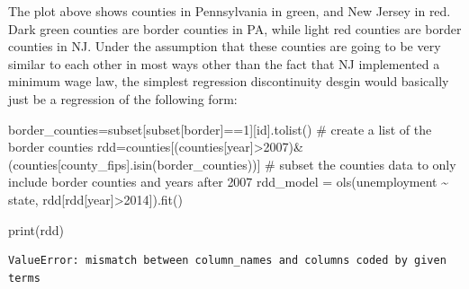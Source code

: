 \documentclass[
  letterpaper,
  DIV=11,
  numbers=noendperiod]{scrreprt}
\newenvironment{Shaded}{\begin{snugshade}}{\end{snugshade}}
\newcommand{\BuiltInTok}[1]{\textcolor[rgb]{0.00,0.23,0.31}{#1}}
\newcommand{\CommentTok}[1]{\textcolor[rgb]{0.37,0.37,0.37}{#1}}
\newcommand{\DecValTok}[1]{\textcolor[rgb]{0.68,0.00,0.00}{#1}}
\newcommand{\NormalTok}[1]{\textcolor[rgb]{0.00,0.23,0.31}{#1}}
\newcommand{\OperatorTok}[1]{\textcolor[rgb]{0.37,0.37,0.37}{#1}}
\newcommand{\StringTok}[1]{\textcolor[rgb]{0.13,0.47,0.30}{#1}}
\begin{document}
The plot above shows counties in Pennsylvania in green, and New Jersey
in red. Dark green counties are border counties in PA, while light red
counties are border counties in NJ. Under the assumption that these
counties are going to be very similar to each other in most ways other
than the fact that NJ implemented a minimum wage law, the simplest
regression discontinuity desgin would basically just be a regression of
the following form:

\begin{Shaded}
\begin{Highlighting}[]
\NormalTok{border\_counties}\OperatorTok{=}\NormalTok{subset[subset[}\StringTok{\textquotesingle{}border\textquotesingle{}}\NormalTok{]}\OperatorTok{==}\DecValTok{1}\NormalTok{][}\StringTok{\textquotesingle{}id\textquotesingle{}}\NormalTok{].tolist() }\CommentTok{\# create a list of the border counties}
\NormalTok{rdd}\OperatorTok{=}\NormalTok{counties[(counties[}\StringTok{\textquotesingle{}year\textquotesingle{}}\NormalTok{]}\OperatorTok{\textgreater{}}\DecValTok{2007}\NormalTok{)}\OperatorTok{\&}\NormalTok{(counties[}\StringTok{\textquotesingle{}county\_fips\textquotesingle{}}\NormalTok{].isin(border\_counties))] }\CommentTok{\# subset the counties data to only include border counties and years after 2007}
\NormalTok{rdd\_model }\OperatorTok{=}\NormalTok{ ols(}\StringTok{\textquotesingle{}unemployment \textasciitilde{} state\textquotesingle{}}\NormalTok{, rdd[rdd[}\StringTok{\textquotesingle{}year\textquotesingle{}}\NormalTok{]}\OperatorTok{\textgreater{}}\DecValTok{2014}\NormalTok{]).fit()}

\BuiltInTok{print}\NormalTok{(rdd)}
\end{Highlighting}
\end{Shaded}

\begin{verbatim}
ValueError: mismatch between column_names and columns coded by given terms
\end{verbatim}
\end{document}
